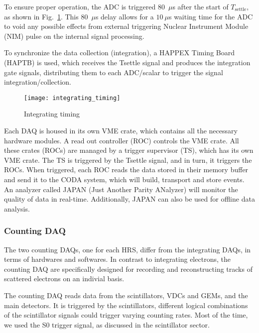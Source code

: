 To ensure proper operation, the ADC is triggered 80~$\mu$s after the start of $T_{\text{settle}}$, as shown in Fig.~\ref{fig:integrating_timing}. This 80~$\mu$s delay allows for a $10\ \mu$s waiting time for 
the ADC to void any possible effects from external triggering Nuclear Instrument Module
(NIM) pulse on the internal signal processing. 

To synchronize the data collection (integration), 
a HAPPEX Timing Board (HAPTB) is used, which receives the Tsettle signal and
produces the integration gate signals, distributing them to each ADC/scalar to trigger
the signal integration/collection.

\begin{figure}
    \centering
    \texttt{[image: integrating\_timing]}
    \caption{Integrating timing}
    \label{fig:integrating_timing}
\end{figure}

Each DAQ is housed in its own VME crate, which contains all the necessary hardware 
modules. A read out controller (ROC) controls the VME crate. All these crates (ROCs) are
managed by a trigger supervisor (TS), which has its own VME crate. The TS is
triggered by the Tsettle signal, and in turn, it triggers the ROCs.
When triggered, each ROC reads the data stored in their memory buffer 
and send it to the CODA system, which will build, transport and store events. 
An analyzer called JAPAN (Just Another Parity ANalyzer) will monitor the 
quality of data in real-time. Additionally, JAPAN can also be used for offline
data analysis.


\subsubsection{Counting DAQ}
The two counting DAQs, one for each HRS, differ from the integrating DAQs,
in terms of hardwares and softwares. In contrast to integrating electrons,
the counting DAQ are specifically designed for recording and reconstructing tracks 
of scattered electrons on an indivial basis.

The counting DAQ reads data from the scintillators, VDCs and GEMs, and the main detectors.
It is triggered by the scintillators, different logical combinations of the scintillator
signals could trigger varying counting rates. Most of the time, we used the S0
trigger signal, as discussed in the scintillator sector.

